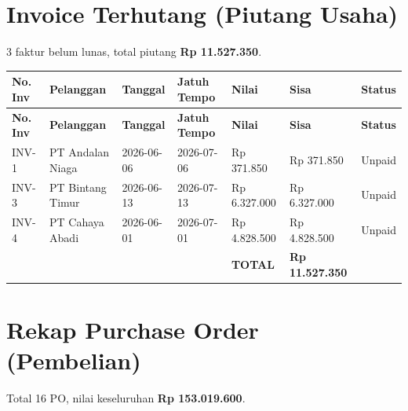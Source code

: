 \documentclass[11pt,a4paper]{article}
\begin{document}
\section{Invoice Terhutang (Piutang Usaha)}
3 faktur belum lunas, total piutang \textbf{Rp 11.527.350}.

{\setlength{\tabcolsep}{5pt}\small
\begin{longtable}{l p{3.2cm} l l R{2.4cm} R{2.4cm} l}
\toprule
\textbf{No. Inv} & \textbf{Pelanggan} & \textbf{Tanggal} & \textbf{Jatuh Tempo} & \textbf{Nilai} & \textbf{Sisa} & \textbf{Status} \\
\midrule\endfirsthead
\toprule
\textbf{No. Inv} & \textbf{Pelanggan} & \textbf{Tanggal} & \textbf{Jatuh Tempo} & \textbf{Nilai} & \textbf{Sisa} & \textbf{Status} \\
\midrule\endhead
\bottomrule\endfoot
INV-1 & PT Andalan Niaga & 2026-06-06 & 2026-07-06 & Rp 371.850 & Rp 371.850 & Unpaid \\
INV-3 & PT Bintang Timur & 2026-06-13 & 2026-07-13 & Rp 6.327.000 & Rp 6.327.000 & Unpaid \\
INV-4 & PT Cahaya Abadi & 2026-06-01 & 2026-07-01 & Rp 4.828.500 & Rp 4.828.500 & Unpaid \\
 &  &  &  & \textbf{TOTAL} & \textbf{Rp 11.527.350} &  \\
\end{longtable}}

\section{Rekap Purchase Order (Pembelian)}
Total 16 PO, nilai keseluruhan \textbf{Rp 153.019.600}.
\end{document}
